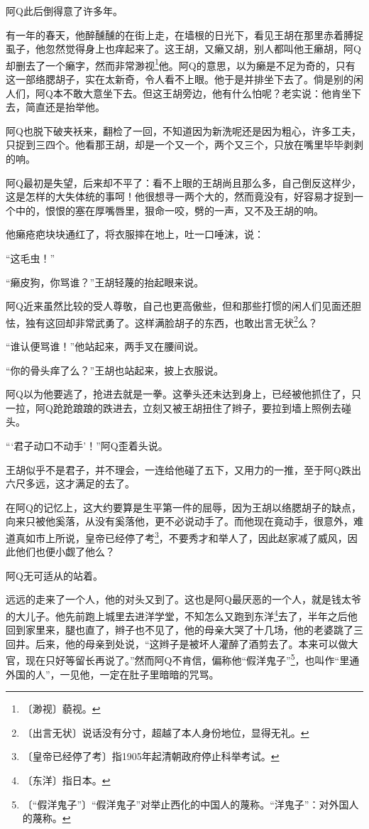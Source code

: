 \documentclass[12pt,UTF-8,openany]{ctexbook}
\begin{document}
\begin{large}
    阿Q此后倒得意了许多年。
    
    有一年的春天，他醉醺醺的在街上走，在墙根的日光下，看见王胡在那里赤着膊捉虱子，他忽然觉得身上也痒起来了。这王胡，又癞又胡，别人都叫他王癞胡，阿Q却删去了一个癞字，然而非常渺视\footnote{〔渺视〕藐视。}他。阿Q的意思，以为癞是不足为奇的，只有这一部络腮胡子，实在太新奇，令人看不上眼。他于是并排坐下去了。倘是别的闲人们，阿Q本不敢大意坐下去。但这王胡旁边，他有什么怕呢？老实说：他肯坐下去，简直还是抬举他。
    
    阿Q也脱下破夹袄来，翻检了一回，不知道因为新洗呢还是因为粗心，许多工夫，只捉到三四个。他看那王胡，却是一个又一个，两个又三个，只放在嘴里毕毕剥剥的响。
    
    阿Q最初是失望，后来却不平了：看不上眼的王胡尚且那么多，自己倒反这样少，这是怎样的大失体统的事呵！他很想寻一两个大的，然而竟没有，好容易才捉到一个中的，恨恨的塞在厚嘴唇里，狠命一咬，劈的一声，又不及王胡的响。
    
    他癞疮疤块块通红了，将衣服摔在地上，吐一口唾沫，说：
    
    “这毛虫！”
    
    “癞皮狗，你骂谁？”王胡轻蔑的抬起眼来说。
    
    阿Q近来虽然比较的受人尊敬，自己也更高傲些，但和那些打惯的闲人们见面还胆怯，独有这回却非常武勇了。这样满脸胡子的东西，也敢出言无状\footnote{〔出言无状〕说话没有分寸，超越了本人身份地位，显得无礼。}么？
    
    “谁认便骂谁！”他站起来，两手叉在腰间说。
    
    “你的骨头痒了么？”王胡也站起来，披上衣服说。
    
    阿Q以为他要逃了，抢进去就是一拳。这拳头还未达到身上，已经被他抓住了，只一拉，阿Q跄跄踉踉的跌进去，立刻又被王胡扭住了辫子，要拉到墙上照例去碰头。
    
    “‘君子动口不动手’！”阿Q歪着头说。
    
    王胡似乎不是君子，并不理会，一连给他碰了五下，又用力的一推，至于阿Q跌出六尺多远，这才满足的去了。
    
    在阿Q的记忆上，这大约要算是生平第一件的屈辱，因为王胡以络腮胡子的缺点，向来只被他奚落，从没有奚落他，更不必说动手了。而他现在竟动手，很意外，难道真如市上所说，皇帝已经停了考\footnote{〔皇帝已经停了考〕指1905年起清朝政府停止科举考试。}，不要秀才和举人了，因此赵家减了威风，因此他们也便小觑了他么？
    
    阿Q无可适从的站着。
    
    远远的走来了一个人，他的对头又到了。这也是阿Q最厌恶的一个人，就是钱太爷的大儿子。他先前跑上城里去进洋学堂，不知怎么又跑到东洋\footnote{〔东洋〕指日本。}去了，半年之后他回到家里来，腿也直了，辫子也不见了，他的母亲大哭了十几场，他的老婆跳了三回井。后来，他的母亲到处说，“这辫子是被坏人灌醉了酒剪去了。本来可以做大官，现在只好等留长再说了。”然而阿Q不肯信，偏称他“假洋鬼子”\footnote{〔“假洋鬼子”〕“假洋鬼子”对举止西化的中国人的蔑称。“洋鬼子”：对外国人的蔑称。}，也叫作“里通外国的人”，一见他，一定在肚子里暗暗的咒骂。
    

\end{large}
\end{document}
